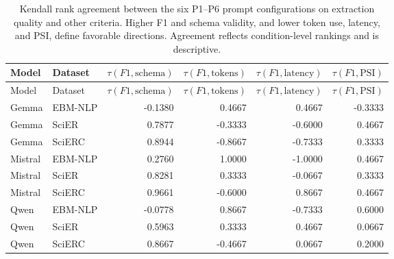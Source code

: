 \documentclass[fleqn,10pt]{wlscirep-authoryear}
\begin{document}
\begingroup
\footnotesize
\setlength{\tabcolsep}{4pt}
\setlength{\LTleft}{0pt}
\setlength{\LTright}{0pt}
\begin{longtable}{llrrrr}
\caption{Kendall rank agreement between the six P1--P6 prompt configurations on extraction quality and other criteria. Higher F1 and schema validity, and lower token use, latency, and PSI, define favorable directions. Agreement reflects condition-level rankings and is descriptive.}\label{tab:r1-rq5-rank}\\
\toprule
Model & Dataset & $\tau(F1,\mathrm{schema})$ & $\tau(F1,\mathrm{tokens})$ & $\tau(F1,\mathrm{latency})$ & $\tau(F1,\mathrm{PSI})$ \\
\midrule
\endfirsthead
\toprule
Model & Dataset & $\tau(F1,\mathrm{schema})$ & $\tau(F1,\mathrm{tokens})$ & $\tau(F1,\mathrm{latency})$ & $\tau(F1,\mathrm{PSI})$ \\
\midrule
\endhead
\bottomrule
\endfoot
Gemma & EBM-NLP & -0.1380 & 0.4667 & 0.4667 & -0.3333 \\
Gemma & SciER & 0.7877 & -0.3333 & -0.6000 & 0.4667 \\
Gemma & SciERC & 0.8944 & -0.8667 & -0.7333 & 0.3333 \\
Mistral & EBM-NLP & 0.2760 & 1.0000 & -1.0000 & 0.4667 \\
Mistral & SciER & 0.8281 & 0.3333 & -0.0667 & 0.3333 \\
Mistral & SciERC & 0.9661 & -0.6000 & 0.8667 & 0.4667 \\
Qwen & EBM-NLP & -0.0778 & 0.8667 & -0.7333 & 0.6000 \\
Qwen & SciER & 0.5963 & 0.3333 & 0.4667 & 0.0667 \\
Qwen & SciERC & 0.8667 & -0.4667 & 0.0667 & 0.2000 \\
\end{longtable}
\endgroup
\end{document}
